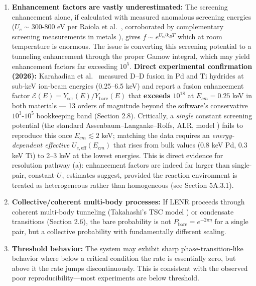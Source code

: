 \documentclass[11pt,a4paper]{article}
\begin{document}
\begin{enumerate}
\def\labelenumi{\arabic{enumi}.}
\item
  \textbf{Enhancement factors are vastly underestimated:} The screening enhancement alone, if calculated with measured anomalous screening energies ($U_e \sim 300\text{-}800$ eV per Raiola et al.~\citep{raiola2002}, corroborated by complementary screening measurements in metals \citep{huke2008}), gives $f \sim e^{U_e / k_B T}$ which at room temperature is enormous. The issue is converting this screening potential to a tunneling enhancement through the proper Gamow integral, which may yield enhancement factors far exceeding $10^5$. \textbf{Direct experimental confirmation (2026):} Karahadian et al.~\citep{karahadian2026} measured D--D fusion in Pd and Ti hydrides at sub-keV ion-beam energies (0.25--6.5 keV) and report a fusion enhancement factor $\mathcal{E}(E) = Y_{\text{scr}}(E)/Y_{\text{bare}}(E)$ that \textbf{exceeds $10^{18}$} at $E_{cm} = 0.25$ keV in both materials --- 13 orders of magnitude beyond the software's conservative $10^3\text{-}10^5$ bookkeeping band (Section 2.8). Critically, a \emph{single} constant screening potential (the standard Assenbaum--Langanke--Rolfs, ALR, model \citep{bellucci2023}) fails to reproduce this once $E_{cm} \lesssim 2$ keV; matching the data requires an \emph{energy-dependent effective} $U_{e,\text{eff}}(E_{cm})$ that rises from bulk values (0.8 keV Pd, 0.3 keV Ti) to 2--3 keV at the lowest energies. This is direct evidence for resolution pathway (a): enhancement factors are indeed far larger than single-pair, constant-$U_e$ estimates suggest, provided the reaction environment is treated as heterogeneous rather than homogeneous (see Section 5A.3.1).
\item
  \textbf{Collective/coherent multi-body processes:} If LENR proceeds through coherent multi-body tunneling (Takahashi's TSC model \citep{takahashi2004}) or condensate transitions (Section 2.6), the bare probability is not $P_{\text{bare}} = e^{-2\pi\eta}$ for a single pair, but a collective probability with fundamentally different scaling.
\item
  \textbf{Threshold behavior:} The system may exhibit sharp phase-transition-like behavior where below a critical condition the rate is essentially zero, but above it the rate jumps discontinuously. This is consistent with the observed poor reproducibility---most experiments are below threshold.
\end{enumerate}
\end{document}
